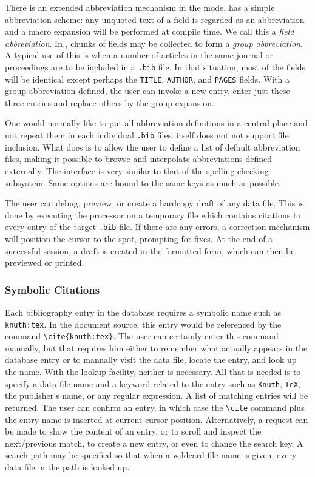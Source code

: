 There is an extended abbreviation mechanism in the mode.
{\BibTeX} has a simple abbreviation scheme: any unquoted text of a field
is regarded
as an abbreviation and a macro expansion will be performed at compile time.
We call this a {\it field abbreviation\/}.  In {\BM}, chunks of fields may be
collected to form a {\it group abbreviation\/}.
A typical use of this is when a number of articles in the
same journal or proceedings are to be included in a \verb|.bib| file.
In that situation, most of the fields will be identical except perhaps
the \verb|TITLE|, \verb|AUTHOR|, and \verb|PAGES| fields.  With a group
abbreviation defined, the user can invoke a new entry, enter just these
three entries and replace others by the group expansion.

One would normally like to put all abbreviation
definitions in a central place and not repeat them in each individual 
\verb|.bib| files.  {\BibTeX} itself does not not support file inclusion.
What {\BM} does is to allow the user to define a list of
default abbreviation files, making it possible to browse and interpolate
abbreviations defined externally.  The interface is very similar to
that of the spelling checking subsystem.  Same options are bound to the
same keys as much as possible.

The user can debug, preview, or create a hardcopy draft of any {\BibTeX}
data file.  This is done by executing the {\BibTeX} processor on a temporary
file which contains citations to every entry of the target \verb|.bib| file.
If there are any errors, a correction mechanism will position the cursor
to the spot, prompting for fixes.  At the end of a successful session,
a draft is created in the formatted form, which can then be previewed
or printed.


\subsubsection{Symbolic Citations}
Each bibliography entry in the database requires a symbolic name such as
\verb|knuth:tex|.  In the document source, this entry would be referenced
by the command \verb|\cite{knuth:tex}|.  The user can certainly enter this
command manually, but that requires him either to remember what actually
appears in the database entry or to manually visit the data file,
locate the entry, and look up the name.
With the {\TM} lookup facility, neither
is necessary.  All that is needed is to specify a data file name
and a keyword related to the entry such as \verb|Knuth|, \verb|TeX|,
the publisher's name, or any regular expression.
A list of matching entries will be returned.
The user can confirm an entry, in which case the \verb|\cite| command 
plus the entry name is inserted at current cursor position.
Alternatively, a request can be made
to show the content of an entry, or to scroll and inspect the next/previous
match, to create a new entry, or even to change the search key.  A search path
may be specified so that when a wildcard file name is given, every data file
in the path is looked up.

